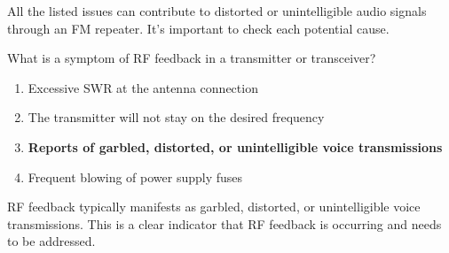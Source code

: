All the listed issues can contribute to distorted or unintelligible audio signals through an FM repeater. It's important to check each potential cause.

\begin{tcolorbox}[colback=gray!10!white,colframe=black!75!black,title={T7B11}]
    What is a symptom of RF feedback in a transmitter or transceiver?
    \begin{enumerate}[label=\Alph*),noitemsep]
        \item Excessive SWR at the antenna connection
        \item The transmitter will not stay on the desired frequency
        \item \textbf{Reports of garbled, distorted, or unintelligible voice transmissions}
        \item Frequent blowing of power supply fuses
    \end{enumerate}
\end{tcolorbox}

RF feedback typically manifests as garbled, distorted, or unintelligible voice transmissions. This is a clear indicator that RF feedback is occurring and needs to be addressed.

